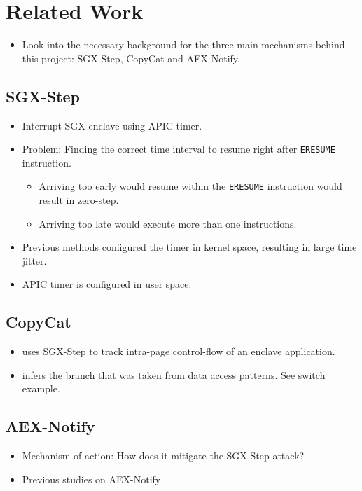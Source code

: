 \documentclass{llncs}
\begin{document}
\section{Related Work}
\begin{itemize}
  \item 
    Look into the necessary background for the three main mechanisms
    behind this project: SGX-Step, CopyCat and AEX-Notify.
\end{itemize}

\subsection{SGX-Step} 
\begin{itemize}
  \item Interrupt SGX enclave using APIC timer.
  \item Problem: Finding the correct time interval to resume right after \texttt{ERESUME} instruction.
    \begin{itemize}
      \item Arriving too early would resume within the \texttt{ERESUME} instruction would result in zero-step.
      \item Arriving too late would execute more than one instructions.
    \end{itemize}
  \item Previous methods configured the timer in kernel space, resulting in large time jitter.
  \item APIC timer is configured in user space.
\end{itemize}

\subsection{CopyCat}
\begin{itemize}
  \item uses SGX-Step to track intra-page control-flow of an enclave application.
  \item infers the branch that was taken from data access patterns. See switch example.
\end{itemize}

\subsection{AEX-Notify}
\begin{itemize}
  \item Mechanism of action: How does it mitigate the SGX-Step attack?
  \item Previous studies on AEX-Notify
\end{itemize}
\end{document}
